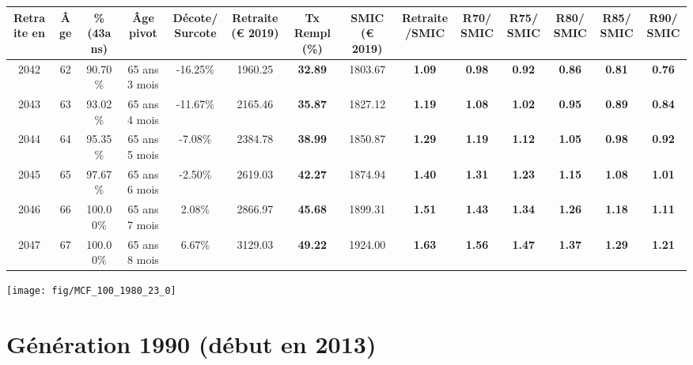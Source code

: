 \begin{adjustbox}{max width=\textwidth} 
\begin{tabular}[htb]{|c|c||c|c|c||c|c||c|c||c|c|c|c|c|} 
\hline 
 Retraite en &  Âge &  \%(43ans) &  Âge pivot &  Décote/Surcote &  Retraite (\euro{} 2019) &  Tx Rempl(\%) &  SMIC (\euro{} 2019) &  Retraite/SMIC &  R70/SMIC &  R75/SMIC &  R80/SMIC &  R85/SMIC &  R90/SMIC \\ 
\hline \hline 
 2042 &  62 &  90.70\% &  65 ans 3 mois &  -16.25\% &  1960.25 &  {\bf 32.89} &  1803.67 &  {\bf 1.09} &  {\bf {\color{red} 0.98}} &  {\bf {\color{red} 0.92}} &  {\bf {\color{red} 0.86}} &  {\bf {\color{red} 0.81}} &  {\bf {\color{red} 0.76}} \\ 
\hline 
 2043 &  63 &  93.02\% &  65 ans 4 mois &  -11.67\% &  2165.46 &  {\bf 35.87} &  1827.12 &  {\bf 1.19} &  {\bf 1.08} &  {\bf 1.02} &  {\bf {\color{red} 0.95}} &  {\bf {\color{red} 0.89}} &  {\bf {\color{red} 0.84}} \\ 
\hline 
 2044 &  64 &  95.35\% &  65 ans 5 mois &  -7.08\% &  2384.78 &  {\bf 38.99} &  1850.87 &  {\bf 1.29} &  {\bf 1.19} &  {\bf 1.12} &  {\bf 1.05} &  {\bf {\color{red} 0.98}} &  {\bf {\color{red} 0.92}} \\ 
\hline 
 2045 &  65 &  97.67\% &  65 ans 6 mois &  -2.50\% &  2619.03 &  {\bf 42.27} &  1874.94 &  {\bf 1.40} &  {\bf 1.31} &  {\bf 1.23} &  {\bf 1.15} &  {\bf 1.08} &  {\bf 1.01} \\ 
\hline 
 2046 &  66 &  100.00\% &  65 ans 7 mois &  2.08\% &  2866.97 &  {\bf 45.68} &  1899.31 &  {\bf 1.51} &  {\bf 1.43} &  {\bf 1.34} &  {\bf 1.26} &  {\bf 1.18} &  {\bf 1.11} \\ 
\hline 
 2047 &  67 &  100.00\% &  65 ans 8 mois &  6.67\% &  3129.03 &  {\bf 49.22} &  1924.00 &  {\bf 1.63} &  {\bf 1.56} &  {\bf 1.47} &  {\bf 1.37} &  {\bf 1.29} &  {\bf 1.21} \\ 
\hline 
\hline 
\end{tabular} 
\end{adjustbox} 
 
 \vspace{0.1cm} 

 {\hspace{-2.2cm}\texttt{[image: fig/MCF\_100\_1980\_23\_0]}} 

\newpage 
 
\section{Génération 1990 (début en 2013)\label{MCF_100_1990_23_0}} 
 
